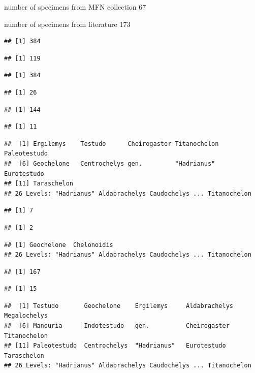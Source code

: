 \documentclass[]{article}
\begin{document}
number of specimens from MFN collection 67

number of specimens from literature 173

\begin{verbatim}
## [1] 384
\end{verbatim}

\begin{verbatim}
## [1] 119
\end{verbatim}

\begin{verbatim}
## [1] 384
\end{verbatim}

\begin{verbatim}
## [1] 26
\end{verbatim}

\begin{verbatim}
## [1] 144
\end{verbatim}

\begin{verbatim}
## [1] 11
\end{verbatim}

\begin{verbatim}
##  [1] Ergilemys    Testudo      Cheirogaster Titanochelon Paleotestudo
##  [6] Geochelone   Centrochelys gen.         "Hadrianus"  Eurotestudo 
## [11] Taraschelon 
## 26 Levels: "Hadrianus" Aldabrachelys Caudochelys ... Titanochelon
\end{verbatim}

\begin{verbatim}
## [1] 7
\end{verbatim}

\begin{verbatim}
## [1] 2
\end{verbatim}

\begin{verbatim}
## [1] Geochelone  Chelonoidis
## 26 Levels: "Hadrianus" Aldabrachelys Caudochelys ... Titanochelon
\end{verbatim}

\begin{verbatim}
## [1] 167
\end{verbatim}

\begin{verbatim}
## [1] 15
\end{verbatim}

\begin{verbatim}
##  [1] Testudo       Geochelone    Ergilemys     Aldabrachelys Megalochelys 
##  [6] Manouria      Indotestudo   gen.          Cheirogaster  Titanochelon 
## [11] Paleotestudo  Centrochelys  "Hadrianus"   Eurotestudo   Taraschelon  
## 26 Levels: "Hadrianus" Aldabrachelys Caudochelys ... Titanochelon
\end{verbatim}
\end{document}
